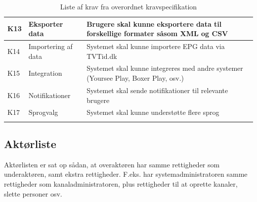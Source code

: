 \begin{longtable}[h]{ |p{1cm}|p{4cm}|p{11cm}| }
\hline
K13 & Eksporter data & Brugere skal kunne eksportere data til forskellige formater såsom XML og CSV \\
\hline
K14 & Importering af data & Systemet skal kunne importere EPG data via TVTid.dk \\
\hline
K15 & Integration & Systemet skal kunne integreres med andre systemer (Yoursee Play, Boxer Play, osv.) \\
\hline
K16 & Notifikationer & Systemet skal sende notifikationer til relevante brugere \\
\hline
K17 & Sprogvalg & Systemet skal kunne understøtte flere sprog \\
\hline
\caption{Liste af krav fra overordnet kravspecifikation} 
\label{table:kravliste}
\end{longtable} 

\subsection{Aktørliste}
Aktørlisten er sat op sådan, at overaktøren har samme rettigheder som underaktøren, samt ekstra rettigheder. F.eks. har systemadministratoren samme rettigheder som kanaladministratoren, plus rettigheder til at oprette kanaler, slette personer osv.\\


